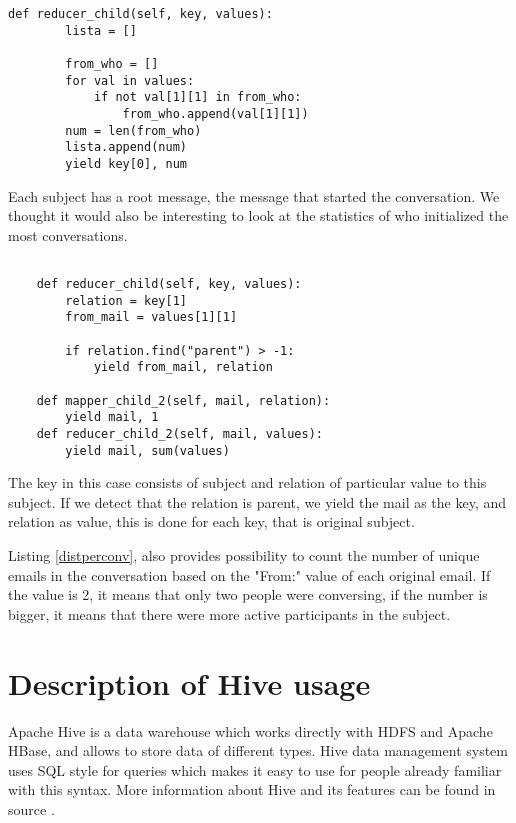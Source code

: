 \documentclass{llncs}
\begin{document}
\begin{lstlisting}[caption={topics with the most participants}, label={populartopic}]
	def reducer_child(self, key, values):
		lista = []

		from_who = []
		for val in values:
			if not val[1][1] in from_who:
				from_who.append(val[1][1])
		num = len(from_who)
		lista.append(num)
        yield key[0], num
\end{lstlisting}


Each subject has a root message, the message that started the conversation. We thought it would also be interesting to look at the statistics of who initialized the most conversations.
\begin{lstlisting}[caption={This reducer is using mapper from step 1}, label={numparents}]

	def reducer_child(self, key, values):
		relation = key[1]
		from_mail = values[1][1]

		if relation.find("parent") > -1:
			yield from_mail, relation

	def mapper_child_2(self, mail, relation):
		yield mail, 1
	def reducer_child_2(self, mail, values):
		yield mail, sum(values)
\end{lstlisting}
The key in this case consists of subject and relation of particular value to this subject. If we detect that the relation is parent, we yield the mail as the key, and relation as value, this is done for each key, that is original subject.


Listing \ref{distperconv}, also provides possibility to count the number of unique emails in the conversation based on the "From:" value of each original email. If the value is 2, it means that only two people were conversing, if the number is bigger, it means that there were more active participants in the subject.




\section{Description of Hive usage}
Apache Hive is a data warehouse which works directly with HDFS and Apache HBase, and allows to store data of different types. Hive data management system uses SQL style for queries which makes it easy to use for people already familiar with this syntax. More information about Hive and its features can be found in source \cite{hive wikipedia}.
\end{document}
